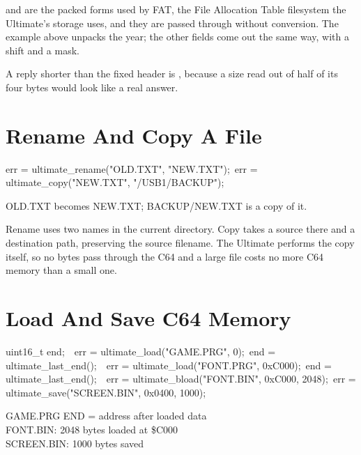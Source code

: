  and  are the packed forms used by FAT, the File Allocation
Table filesystem the Ultimate's storage uses, and they are passed through
without conversion. The example above unpacks the year; the other fields come
out the same way, with a shift and a mask.

A reply shorter than the fixed header is , because
a size read out of half of its four bytes would look like a real answer.


\section{Rename And Copy A File}

\begin{listingbox}
err = ultimate\_rename("OLD.TXT", "NEW.TXT");\
err = ultimate\_copy("NEW.TXT", "/USB1/BACKUP");
\end{listingbox}

\begin{resultbox}
OLD.TXT becomes NEW.TXT; BACKUP/NEW.TXT is a copy of it.
\end{resultbox}

Rename uses two names in the current directory. Copy takes a source there and
a destination path, preserving the source filename. The Ultimate performs
the copy itself, so no bytes pass through the C64 and a large file costs no more
C64 memory than a small one.


\section{Load And Save C64 Memory}

\begin{listingbox}
uint16\_t end;\
\
err = ultimate\_load("GAME.PRG", 0);\
end = ultimate\_last\_end();\
\
err = ultimate\_load("FONT.PRG", 0xC000);\
end = ultimate\_last\_end();\
\
err = ultimate\_bload("FONT.BIN", 0xC000, 2048);\
err = ultimate\_save("SCREEN.BIN", 0x0400, 1000);
\end{listingbox}

\begin{resultbox}
GAME.PRG END = address after loaded data\\
FONT.BIN: 2048 bytes loaded at \$C000\\
SCREEN.BIN: 1000 bytes saved
\end{resultbox}

